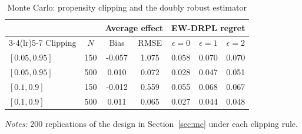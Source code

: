 \begin{table}[htbp]
\centering
\caption{Monte Carlo: propensity clipping and the doubly robust estimator}\label{tab:mc_trim}
\small
\begin{tabular}{lcccccc}
\toprule
 & & \multicolumn{2}{c}{Average effect} & \multicolumn{3}{c}{EW-DRPL regret} \\
\cmidrule(lr){3-4}\cmidrule(lr){5-7}
Clipping & $N$ & Bias & RMSE & $\epsilon=0$ & $\epsilon=1$ & $\epsilon=2$ \\
\midrule
$[0.05,0.95]$ & 150 & -0.057 & 1.075 & 0.058 & 0.070 & 0.070 \\
$[0.05,0.95]$ & 500 & 0.010 & 0.072 & 0.028 & 0.047 & 0.051 \\
$[0.1,0.9]$ & 150 & -0.012 & 0.559 & 0.055 & 0.068 & 0.067 \\
$[0.1,0.9]$ & 500 & 0.011 & 0.065 & 0.027 & 0.044 & 0.048 \\
\bottomrule
\end{tabular}
\begin{minipage}{0.95\textwidth}\footnotesize\smallskip
\emph{Notes:} 200 replications of the design in Section~\ref{sec:mc} under each clipping rule.
\end{minipage}
\end{table}
